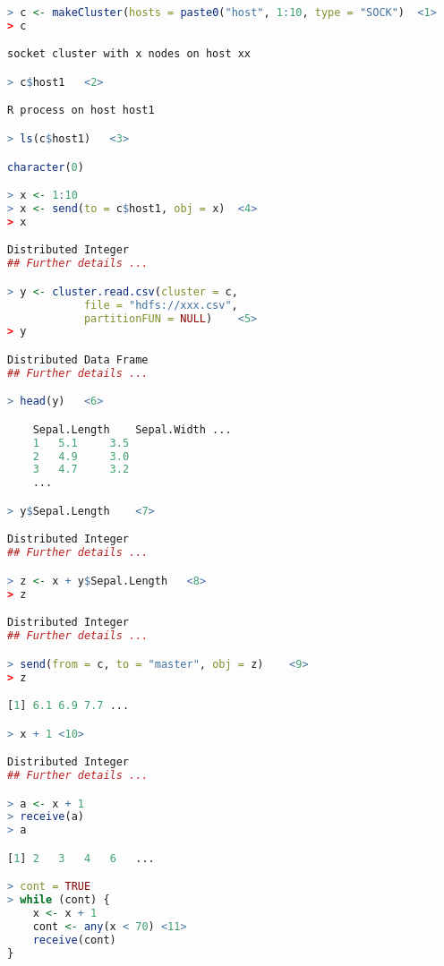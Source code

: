 \documentclass[a4paper,10pt]{article}
\begin{document}
\begin{lstlisting}[language=R]
> c <- makeCluster(hosts = paste0("host", 1:10, type = "SOCK")	<1>
> c

socket cluster with x nodes on host xx

> c$host1	<2>

R process on host host1

> ls(c$host1)	<3>

character(0)

> x <- 1:10
> x <- send(to = c$host1, obj = x)	<4>
> x

Distributed Integer
## Further details ...

> y <- cluster.read.csv(cluster = c, 
			file = "hdfs://xxx.csv",
			partitionFUN = NULL)	<5>
> y

Distributed Data Frame
## Further details ...

> head(y)	<6>

	Sepal.Length	Sepal.Width	...
	1	5.1		3.5
	2	4.9		3.0
	3	4.7		3.2
	...

> y$Sepal.Length	<7>

Distributed Integer
## Further details ...

> z <- x + y$Sepal.Length	<8>
> z

Distributed Integer
## Further details ...

> send(from = c, to = "master", obj = z)	<9>
> z

[1]	6.1	6.9	7.7	...

> x + 1	<10>

Distributed Integer
## Further details ...

> a <- x + 1
> receive(a)
> a

[1]	2	3	4	6	...

> cont = TRUE
> while (cont) {
	x <- x + 1
	cont <- any(x < 70)	<11>
	receive(cont)
}
\end{lstlisting}
\end{document}
